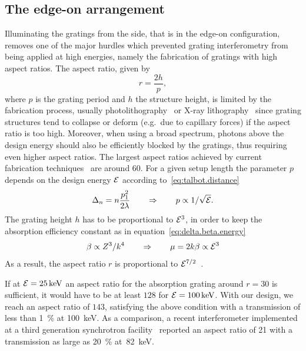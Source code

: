 \subsection{The edge-on arrangement}\label{sec:edge-on-arrangement}
Illuminating the gratings from the side, that is in the edge-on
configuration, removes one of the major hurdles which prevented grating interferometry from
being applied at high energies, namely the fabrication of gratings
with high aspect ratios. The aspect ratio, given by
\begin{equation}
    r = \frac{2h}{p},
\end{equation}
where $p$ is the
grating period and $h$ the  structure height, is limited by the
fabrication process, usually photolithography~\parencite{David2002} or X-ray
lithography~\parencite{Mohr2012} since grating structures tend to collapse or deform
(e.g.\ due to capillary forces) if the aspect ratio is too high.
Moreover, when using a broad spectrum, photons above the design energy
should also be efficiently blocked by the gratings, thus requiring even
higher aspect ratios. The largest aspect ratios achieved by current
fabrication techniques~\parencite{David2007,Kenntner2010} are around 60.
For a given setup length the parameter $p$ depends on the design energy
$\mathcal{E}$ according to~\eqref{eq:talbot.distance}
\begin{equation}
    \Delta_n = n \frac{p_1^2}{2 \lambda} \qquad \Rightarrow \qquad p \propto 1/\sqrt{\mathcal{E}}.\label{eq:period.energy}
\end{equation}
The grating height $h$ has to be proportional to $\mathcal{E}^3$, in order to
keep the absorption efficiency constant as in
equation~\eqref{eq:delta.beta.energy}
\begin{equation}
    \beta \propto Z^3 / k^4 \qquad \Rightarrow \qquad \mu = 2k\beta \propto
    \mathcal{E}^3
    \label{eq:absorption.energy}
\end{equation}
As a result, the aspect ratio $r$ is proportional to $\mathcal{E}^{7/2}$~\parencite{Momose2003a}.

If at $\mathcal{E}=\SI{25}{\kilo\electronvolt}$ an aspect ratio for the
absorption grating around $r=30$ is sufficient, it would have
to be at least $\num{128}$ for $\energy=\SI{100}{\kilo\eV}$. With our
design, we reach an aspect ratio of $\num{143}$, satisfying the above
condition with a transmission of less than \SI{1}{\percent} at
\SI{100}{\kilo\eV}. As a comparison, a recent interferometer implemented at
a third generation synchrotron facility~\parencite{Willner2013} reported an
aspect ratio of \num{21} with a transmission as large as \SI{20}{\percent}
at~\SI{82}{\kilo\eV}.

